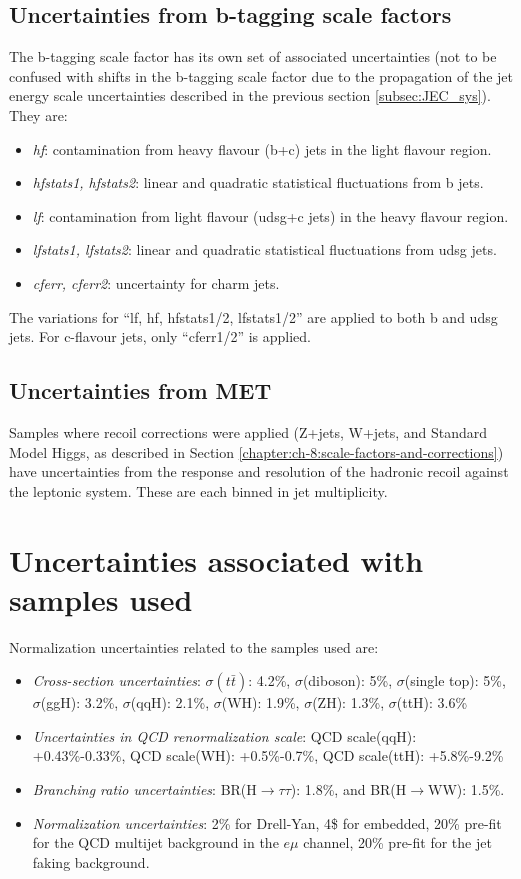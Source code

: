 \subsection{Uncertainties from b-tagging scale factors}
The b-tagging scale factor has its own set of associated uncertainties (not to be confused with shifts in the b-tagging scale factor due to the propagation of the jet energy scale uncertainties described in the previous section \ref{subsec:JEC_sys}). They are:
\begin{itemize}
    \item \textit{hf}: contamination from heavy flavour (b+c) jets in the light flavour region.
    \item \textit{hfstats1, hfstats2}: linear and quadratic statistical fluctuations from b jets. 
    \item \textit{lf}: contamination from light flavour (udsg+c jets) in the heavy flavour region.
    \item \textit{lfstats1, lfstats2}: linear and quadratic statistical fluctuations from udsg jets.
    \item \textit{cferr, cferr2}: uncertainty for charm jets.
\end{itemize}
The variations for ``lf, hf, hfstats1/2, lfstats1/2'' are applied to both b and udsg jets. For c-flavour jets, only ``cferr1/2'' is applied.

\subsection{Uncertainties from MET}
Samples where recoil corrections were applied (Z+jets, W+jets, and Standard Model Higgs, as described in Section \ref{chapter:ch-8:scale-factors-and-corrections}) have uncertainties from the response and resolution of the hadronic recoil against the leptonic system. These are each binned in jet multiplicity.

\section{Uncertainties associated with samples used}
Normalization uncertainties related to the samples used are:
\begin{itemize}
    \item \textit{Cross-section uncertainties}: $\sigma(t\bar{t})$: 4.2\%, $\sigma$(diboson): 5\%,  $\sigma$(single top): 5\%, $\sigma$(ggH): 3.2\%, $\sigma$(qqH): 2.1\%, $\sigma$(WH): 1.9\%, $\sigma$(ZH): 1.3\%, $\sigma$(ttH): 3.6\%
    \item \textit{Uncertainties in QCD renormalization scale}: QCD scale(qqH): +0.43\%-0.33\%, QCD scale(WH): +0.5\%-0.7\%, QCD scale(ttH): +5.8\%-9.2\%
    \item \textit{Branching ratio uncertainties}: BR(H$\rightarrow\tau\tau$): 1.8\%, and BR(H$\rightarrow$WW): 1.5\%.
    \item \textit{Normalization uncertainties}: 2\% for Drell-Yan, 4\$ for embedded, 20\% pre-fit for the QCD multijet background in the $e\mu$ channel, 20\% pre-fit for the jet faking background.
\end{itemize}

